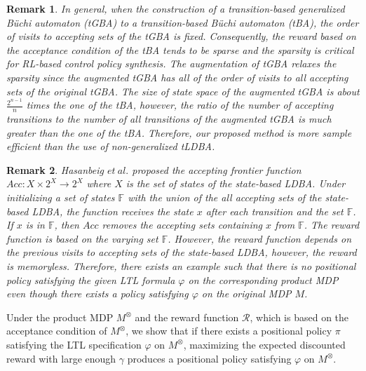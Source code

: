 \documentclass[letterpaper, 10 pt, conference]{ieeeconf}  %
\newtheorem{remark}{Remark}
\begin{document}
\begin{remark}
  In general, when the construction of a transition-based generalized B\"{u}chi automaton (tGBA) to a transition-based B\"{u}chi automaton (tBA), the order of visits to accepting sets of the tGBA is fixed. Consequently, the reward based on the acceptance condition of the tBA tends to be sparse and the sparsity is critical for RL-based control policy synthesis. The augmentation of tGBA relaxes the sparsity since the augmented tGBA has all of the order of visits to all accepting sets of the original tGBA. The size of state space of the augmented tGBA is about $\frac{2^{n-1}}{n}$ times the one of the tBA, however, the ratio of the number of accepting transitions to the number of all transitions of the augmented tGBA is much greater than the one of the tBA. Therefore, our proposed method is more sample efficient than the use of non-generalized tLDBA.
\end{remark}

\begin{remark}
  Hasanbeig $et\ al.$\cite{HAK2019} proposed the accepting frontier function $Acc : X \times 2^X \rightarrow 2^X $ where $X$ is the set of states of the state-based LDBA. Under initializing a set of states $ \mathbb{F} $ with the union of the all accepting sets of the state-based LDBA, the function receives the state $x$ after each transition and the set $\mathbb{F}$. If $x$ is in $\mathbb{F}$, then $Acc$ removes the accepting sets containing $x$ from $\mathbb{F}$. The reward function is based on the varying set $\mathbb{F}$. However, the reward function depends on the previous visits to accepting sets of the state-based LDBA, however, the reward is memoryless. Therefore, there exists an example such that there is no positional policy satisfying the given LTL formula $\varphi$ on the corresponding product MDP even though there exists a policy satisfying $\varphi$ on the original MDP $M$.
\end{remark}

Under the product MDP $M^{\otimes}$ and the reward function $\mathcal{R}$, which is based on the acceptance condition of $ M^\otimes $, we show that if there exists a positional policy $\pi$ satisfying the LTL specification $\varphi$ on $M^{\otimes}$, maximizing the expected discounted reward with large enough $\gamma$ produces a positional policy satisfying $\varphi$ on $M^{\otimes}$.
\end{document}
